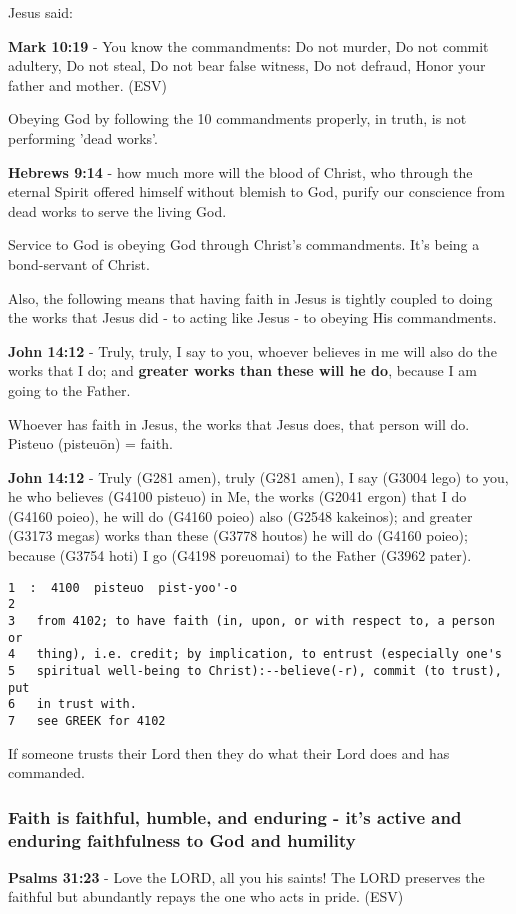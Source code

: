 \documentclass[11pt]{article}
\begin{document}
Jesus said:

\textbf{Mark 10:19} - You know the commandments: Do not murder, Do not commit adultery, Do not steal, Do not bear false witness, Do not defraud, Honor your father and mother. (ESV)

Obeying God by following the 10 commandments properly, in truth, is not performing 'dead works'.

\textbf{Hebrews 9:14} - how much more will the blood of Christ, who through the eternal Spirit offered himself without blemish to God, purify our conscience from dead works to serve the living God.

Service to God is obeying God through Christ's commandments. It's being a bond-servant of Christ.

Also, the following means that having faith in Jesus is tightly coupled to doing the works that Jesus did - to acting like Jesus - to obeying His commandments.

\textbf{John 14:12} - Truly, truly, I say to you, whoever believes in me will also do the works that I do; and \textbf{greater works than these will he do}, because I am going to the Father.

Whoever has faith in Jesus, the works that Jesus does, that person will do.
Pisteuo (pisteuōn) = faith.

\textbf{John 14:12} - Truly (G281 amen), truly (G281 amen), I say (G3004 lego) to you, he who believes (G4100 pisteuo) in Me, the works (G2041 ergon) that I do (G4160 poieo), he will do (G4160 poieo) also (G2548 kakeinos); and greater (G3173 megas) works than these (G3778 houtos) he will do (G4160 poieo); because (G3754 hoti) I go (G4198 poreuomai) to the Father (G3962 pater).

\begin{verbatim}
1  :  4100  pisteuo  pist-yoo'-o
2  
3   from 4102; to have faith (in, upon, or with respect to, a person or
4   thing), i.e. credit; by implication, to entrust (especially one's
5   spiritual well-being to Christ):--believe(-r), commit (to trust), put
6   in trust with.
7   see GREEK for 4102
\end{verbatim}

If someone trusts their Lord then they do what their Lord does and has commanded.

\subsubsection{Faith is faithful, humble, and enduring - it's active and enduring faithfulness to God and humility}
\label{sec:orgaecc032}
\textbf{Psalms 31:23} - Love the LORD, all you his saints! The LORD preserves the faithful but abundantly repays the one who acts in pride. (ESV)
\end{document}
